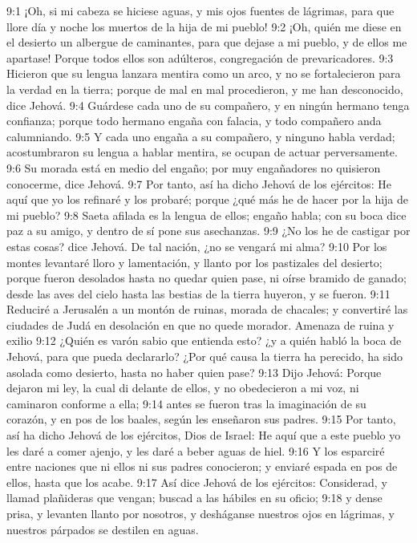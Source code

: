 9:1 ¡Oh, si mi cabeza se hiciese aguas, y mis ojos fuentes de lágrimas, para que llore día y noche los muertos de la hija de mi pueblo! 
9:2 ¡Oh, quién me diese en el desierto un albergue de caminantes, para que dejase a mi pueblo, y de ellos me apartase! Porque todos ellos son adúlteros, congregación de prevaricadores. 
9:3 Hicieron que su lengua lanzara mentira como un arco, y no se fortalecieron para la verdad en la tierra; porque de mal en mal procedieron, y me han desconocido, dice Jehová. 
9:4 Guárdese cada uno de su compañero, y en ningún hermano tenga confianza; porque todo hermano engaña con falacia, y todo compañero anda calumniando. 
9:5 Y cada uno engaña a su compañero, y ninguno habla verdad; acostumbraron su lengua a hablar mentira, se ocupan de actuar perversamente. 
9:6 Su morada está en medio del engaño; por muy engañadores no quisieron conocerme, dice Jehová. 
9:7 Por tanto, así ha dicho Jehová de los ejércitos: He aquí que yo los refinaré y los probaré; porque ¿qué más he de hacer por la hija de mi pueblo? 
9:8 Saeta afilada es la lengua de ellos; engaño habla; con su boca dice paz a su amigo, y dentro de sí pone sus asechanzas. 
9:9 ¿No los he de castigar por estas cosas? dice Jehová. De tal nación, ¿no se vengará mi alma? 
9:10 Por los montes levantaré lloro y lamentación, y llanto por los pastizales del desierto; porque fueron desolados hasta no quedar quien pase, ni oírse bramido de ganado; desde las aves del cielo hasta las bestias de la tierra huyeron, y se fueron. 
9:11 Reduciré a Jerusalén a un montón de ruinas, morada de chacales; y convertiré las ciudades de Judá en desolación en que no quede morador. 
Amenaza de ruina y exilio 
9:12 ¿Quién es varón sabio que entienda esto? ¿y a quién habló la boca de Jehová, para que pueda declararlo? ¿Por qué causa la tierra ha perecido, ha sido asolada como desierto, hasta no haber quien pase? 
9:13 Dijo Jehová: Porque dejaron mi ley, la cual di delante de ellos, y no obedecieron a mi voz, ni caminaron conforme a ella; 
9:14 antes se fueron tras la imaginación de su corazón, y en pos de los baales, según les enseñaron sus padres. 
9:15 Por tanto, así ha dicho Jehová de los ejércitos, Dios de Israel: He aquí que a este pueblo yo les daré a comer ajenjo, y les daré a beber aguas de hiel. 
9:16 Y los esparciré entre naciones que ni ellos ni sus padres conocieron; y enviaré espada en pos de ellos, hasta que los acabe. 
9:17 Así dice Jehová de los ejércitos: Considerad, y llamad plañideras que vengan; buscad a las hábiles en su oficio; 
9:18 y dense prisa, y levanten llanto por nosotros, y desháganse nuestros ojos en lágrimas, y nuestros párpados se destilen en aguas. 
